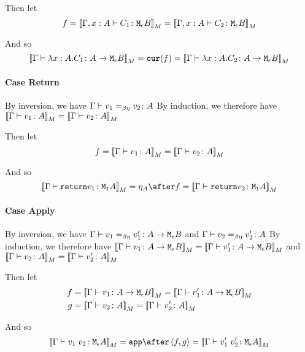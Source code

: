 {        Then let
        \begin{equation}
            f = {\bf [\![}\Gamma, x: A \vdash C_1 \colon \texttt{M}_{\epsilon}{B}{\bf ]\!]}_M = {\bf [\![}\Gamma, x: A \vdash C_2 \colon \texttt{M}_{\epsilon}{B}{\bf ]\!]}_M
        \end{equation}

        And so
        \begin{equation}
            {\bf [\![}\Gamma \vdash \lambda x : A. C_1 \colon A \rightarrow \texttt{M}_{\epsilon}{B}{\bf ]\!]}_M = \texttt{cur}(f) = {\bf [\![}\Gamma \vdash \lambda x : A. C_2 \colon A \rightarrow \texttt{M}_{\epsilon}{B}{\bf ]\!]}_M
        \end{equation}


    \paragraph{Case Return}
    By inversion, we have $\Gamma \vdash v_1 =_{\beta\eta} v_2 \colon A$
    By induction, we therefore have ${\bf [\![}\Gamma \vdash v_1 \colon A{\bf ]\!]}_M = {\bf [\![}\Gamma \vdash v_2 \colon A{\bf ]\!]}_M$

    Then let
    \begin{equation}
        f = {\bf [\![}\Gamma \vdash v_1 \colon A{\bf ]\!]}_M = {\bf [\![}\Gamma \vdash v_2 \colon A{\bf ]\!]}_M
    \end{equation}

    And so
    \begin{equation}
        \deno{\gtyperelation{\return{v_1}}{\M{\1}{A}}} = \point{A}\after f = \deno{\gtyperelation{\return{v_2}}{\M{\1}{A}}}
    \end{equation}


    \paragraph{Case Apply}
    By inversion, we have $\Gamma \vdash v_1 =_{\beta\eta} v_1' \colon A \rightarrow \texttt{M}_{\epsilon}{B}$ and $\Gamma \vdash v_2 =_{\beta\eta} v_2' \colon A$
    By induction, we therefore have ${\bf [\![}\Gamma \vdash v_1 \colon A \rightarrow \texttt{M}_{\epsilon}{B}{\bf ]\!]}_M= {\bf [\![}\Gamma \vdash v_1' \colon A \rightarrow \texttt{M}_{\epsilon}{B}{\bf ]\!]}_M$ and ${\bf [\![}\Gamma \vdash v_2 \colon A{\bf ]\!]}_M = {\bf [\![}\Gamma \vdash v_2' \colon A{\bf ]\!]}_M$

    Then let
    \begin{align}
        f &{}= \deno{\gtyperelation{v_1}{\aeb}} = \deno{\gtyperelation{v_1'}{\aeb}}\\
        g &{}= \deno{\gtyperelation{v_2}{A}} = \deno{\gtyperelation{v_2'}{A}}
    \end{align}



    And so
    \begin{equation}
        \deno{\gtyperelation{\apply{v_1}{v_2}}{\M{\e}{A}}} = \app\after\pr{f}{g} = \deno{\gtyperelation{\apply{v_1'}{v_2'}}{\M{\e}{A}}}
    \end{equation}


}
